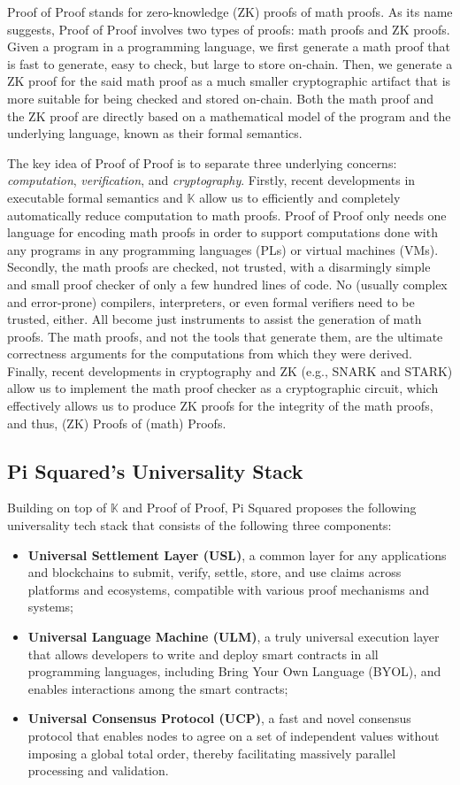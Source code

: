 \documentclass{article}
\newcommand{\K}{\ensuremath{\mathbb{K}}\xspace}
\begin{document}
Proof of Proof stands for zero-knowledge (ZK) proofs of math proofs. 
As its name suggests, Proof of Proof involves two types of proofs:
math proofs and ZK proofs. 
Given a program in a programming language,
we first generate a math proof 
that is fast to generate, easy to check, but large to store on-chain. 
Then, we generate a ZK proof for the said math proof 
as a much smaller cryptographic artifact that is more suitable for
being checked and stored on-chain. 
Both the math proof and the ZK proof are directly based on a mathematical model of
the program and the underlying language, known as their formal semantics. 

The key idea of Proof of Proof is to separate three underlying concerns: \textit{computation}, \textit{verification}, and \textit{cryptography}.
Firstly, recent developments in executable formal semantics and \K 
allow us to efficiently and completely automatically reduce computation to math proofs.  Proof of Proof only needs one language for encoding math proofs in order to 
support computations done with any programs in any programming languages (PLs) or virtual machines (VMs).
Secondly, the math proofs are checked, not trusted, with a disarmingly simple and small proof checker of only a few hundred lines of code.  
No (usually complex and error-prone) compilers, interpreters, or even formal verifiers
need to be trusted, either.
All become just instruments to assist the generation of math proofs.
The math proofs, and not the tools that generate them,
are the ultimate correctness arguments for the computations from which they were derived.
Finally, recent developments in cryptography and ZK (e.g., SNARK and STARK) allow us to implement the math proof checker 
as a cryptographic circuit, which effectively allows us to produce ZK proofs 
for the integrity of the math proofs,
and thus, (ZK) Proofs of (math) Proofs. 

\subsection{Pi Squared's Universality Stack}

Building on top of \K and Proof of Proof,
Pi Squared proposes the following universality tech stack that consists of
the following three components:
\begin{itemize}
    \item \textbf{Universal Settlement Layer (USL)}, a common layer for any applications and blockchains to submit, verify, settle, store, and use claims
    across platforms and ecosystems, compatible with various proof mechanisms and systems; 
    \item \textbf{Universal Language Machine (ULM)}, a truly universal execution layer
    that allows developers to write and deploy smart contracts in all programming languages, including Bring Your Own Language (BYOL), and enables interactions
    among the smart contracts;
    \item \textbf{Universal Consensus Protocol (UCP)}, a fast and novel 
    consensus protocol that enables nodes to agree on a set of independent values without imposing a global total order, 
    thereby facilitating massively parallel processing and validation.
\end{itemize}
\end{document}

